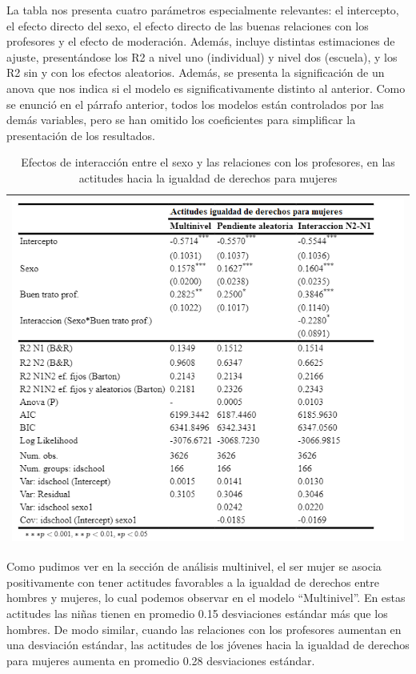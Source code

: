 \documentclass[12pt,twoside]{templates/facsothesis}
\begin{document}
La tabla nos presenta cuatro parámetros especialmente relevantes: el intercepto, el efecto directo del sexo, el efecto directo de las buenas relaciones con los profesores y el efecto de moderación. Además, incluye distintas estimaciones de ajuste, presentándose los R2 a nivel uno (individual) y nivel dos (escuela), y los R2 sin y con los efectos aleatorios. Además, se presenta la significación de un anova que nos indica si el modelo es significativamente distinto al anterior. Como se enunció en el párrafo anterior, todos los modelos están controlados por las demás variables, pero se han omitido los coeficientes para simplificar la presentación de los resultados.

\begin{longtable}[]{@{}l@{}}
\caption{\label{tab:unnamed-chunk-11}Efectos de interacción entre el sexo y las relaciones con los profesores, en las actitudes hacia la igualdad de derechos para mujeres}\tabularnewline
\toprule
\endhead
\includegraphics[width=\textwidth,height=0.7\textheight]{input/images/INTERACCION1.png} \\
\bottomrule
\end{longtable}

Como pudimos ver en la sección de análisis multinivel, el ser mujer se asocia positivamente con tener actitudes favorables a la igualdad de derechos entre hombres y mujeres, lo cual podemos observar en el modelo ``Multinivel''. En estas actitudes las niñas tienen en promedio 0.15 desviaciones estándar más que los hombres. De modo similar, cuando las relaciones con los profesores aumentan en una desviación estándar, las actitudes de los jóvenes hacia la igualdad de derechos para mujeres aumenta en promedio 0.28 desviaciones estándar.
\end{document}
